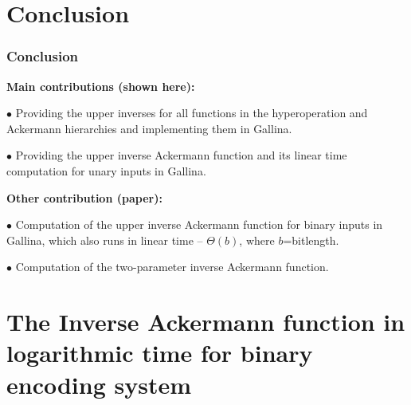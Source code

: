 \documentclass[10pt]{beamer}
\begin{document}
\section*{Conclusion}
\begin{frame}
\frametitle{Conclusion}

\textbf{Main contributions (shown here):}

\smallskip

$\bullet$ Providing the upper inverses for all functions in the hyperoperation and Ackermann hierarchies and implementing them in Gallina.

\smallskip

$\bullet$ Providing the upper inverse Ackermann function and its linear time computation for unary inputs in Gallina.

\bigskip

\pause
\textbf{Other contribution (paper):}

\smallskip

$\bullet$ Computation of the upper inverse Ackermann function for binary inputs in Gallina, which also runs in linear time -- $\Theta(b)$, where $b$=bitlength.

\smallskip

$\bullet$ Computation of the two-parameter inverse Ackermann function.

\end{frame}




\setcounter{totalframenumber}{\inserttotalframenumber}

\appendix


\addtocounter{framenumber}{\value{totalframenumber}}

	


\section{The Inverse Ackermann function in logarithmic time for binary encoding system}
\label{sec: binary}




%
%
\end{document}

